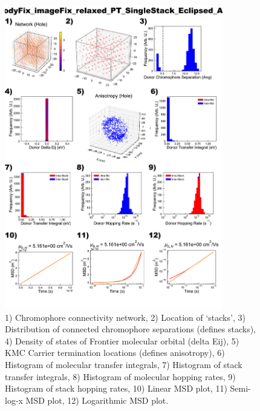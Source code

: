 \documentclass[12pt]{article}
\begin{document}
\begin{figure}[h]\centering
	\includegraphics[width=0.85\textwidth]{Figures/bodyFix_imageFix_relaxed_PT_SingleStack_Eclipsed_AA.png}
    \caption{   1) Chromophore connectivity network, 
                2) Location of `stacks', 
                3) Distribution of connected chromophore separations (defines stacks),
                4) Density of states of Frontier molecular orbital (delta Eij),
                5) KMC Carrier termination locations (defines anisotropy),
                6) Histogram of molecular transfer integrals,
                7) Histogram of stack transfer integrals,
                8) Histogram of molecular hopping rates,
                9) Histogram of stack hopping rates,
                10) Linear MSD plot,
                11) Semi-log-x MSD plot,
                12) Logarithmic MSD plot.}
	\label{fig:PTSingEcl}
\end{figure}
\end{document}
